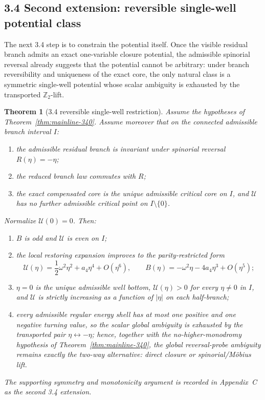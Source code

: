 \documentclass[12pt,a4paper]{article}
\newtheorem{theorem}{Theorem}[section]
\begin{document}
\subsection*{3.4 Second extension: reversible single-well potential class}
The next 3.4 step is to constrain the potential itself. Once the visible residual branch admits an exact one-variable closure potential, the admissible spinorial reversal already suggests that the potential cannot be arbitrary: under branch reversibility and uniqueness of the exact core, the only natural class is a symmetric single-well potential whose scalar ambiguity is exhausted by the transported $\mathbb Z_2$-lift.

\begin{theorem}[3.4 reversible single-well restriction]
\label{thm:mainline-341}
Assume the hypotheses of Theorem~\ref{thm:mainline-340}. Assume moreover that on the connected admissible branch interval $I$:
\begin{enumerate}[label=(\alph*)]
 \item the admissible residual branch is invariant under spinorial reversal $R(\eta)=-\eta$;
 \item the reduced branch law commutes with $R$;
 \item the exact compensated core is the unique admissible critical core on $I$, and $\mathcal U$ has no further admissible critical point on $I\setminus\{0\}$.
\end{enumerate}
Normalize $\mathcal U(0)=0$. Then:
\begin{enumerate}[label=(\roman*)]
 \item $B$ is odd and $\mathcal U$ is even on $I$;
 \item the local restoring expansion improves to the parity-restricted form
 \[
 \mathcal U(\eta)=\frac12\omega^2\eta^2+a_4\eta^4+O(\eta^6),
 \qquad
 B(\eta)=-\omega^2\eta-4a_4\eta^3+O(\eta^5);
 \]
 \item $\eta=0$ is the unique admissible well bottom, $\mathcal U(\eta)>0$ for every $\eta\neq 0$ in $I$, and $\mathcal U$ is strictly increasing as a function of $|\eta|$ on each half-branch;
 \item every admissible regular energy shell has at most one positive and one negative turning value, so the scalar global ambiguity is exhausted by the transported pair $\eta\leftrightarrow-\eta$; hence, together with the no-higher-monodromy hypothesis of Theorem~\ref{thm:mainline-340}, the global reversal-probe ambiguity remains exactly the two-way alternative: direct closure or spinorial/M\"obius lift.
\end{enumerate}
The supporting symmetry and monotonicity argument is recorded in Appendix~C as the second 3.4 extension.
\end{theorem}
\end{document}
